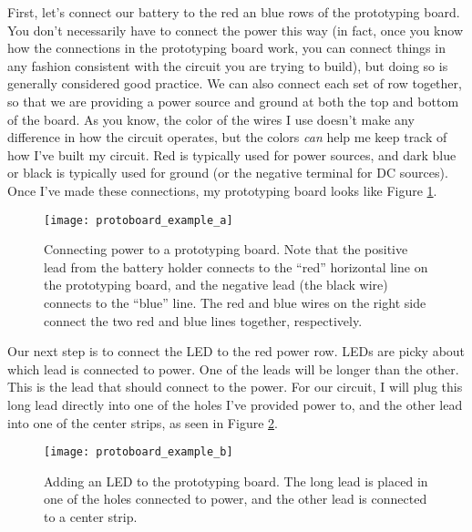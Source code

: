 First, let's connect our battery to the red an blue rows of the 
prototyping board. You don't necessarily have to connect the power this way 
(in fact, once you know how the connections in the prototyping board work, you
can connect things in any fashion consistent with the circuit you are trying 
to build), but doing so is generally considered good practice. We can also
connect each set of row together, so that we are providing a power 
source and ground at both the top and bottom of the board. As you know, the
color of the wires I use doesn't make any difference in how the circuit 
operates, but the colors \textit{can} help me keep track of how I've built my
circuit. Red is typically used for power sources, and dark blue or black is
typically used for ground (or the negative terminal for DC sources). Once I've
made these connections, my prototyping board looks like Figure
\ref{fig:protoboard_example_a}.
\begin{figure}[hbp!]
\centering
\texttt{[image: protoboard\_example\_a]}
\caption[Connecting power to a prototyping board]{Connecting power to a 
prototyping board. Note that the positive lead from the battery holder
connects to the ``red'' horizontal line on the prototyping board, and the
negative lead (the black wire) connects to the ``blue'' line. The red and
blue wires on the right side connect the two red and blue lines together,
respectively.}
\label{fig:protoboard_example_a}
\end{figure}

Our next step is to connect the LED to the red power row. LEDs are picky 
about which lead is connected to power. One of the leads will be longer than the
other. This is the lead that should connect to the power. For our circuit, I 
will plug this long lead directly into one of the holes I've provided power to,
and the other lead into one of the center strips, as seen in Figure
\ref{fig:protoboard_example_b}.
\begin{figure}[hbp!]
\centering
\texttt{[image: protoboard\_example\_b]}
\caption[Adding an LED to the prototyping board]{Adding an LED to the 
prototyping board. The long lead is placed in one of the holes connected
to power, and the other lead is connected to a center strip.}
\label{fig:protoboard_example_b}
\end{figure}


